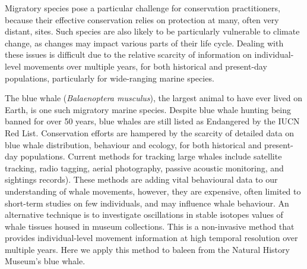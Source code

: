 \documentclass[a4paper,12pt]{article}
\begin{document}
Migratory species pose a particular challenge for conservation practitioners, because their effective conservation relies on protection at many, often very distant, sites\cite{runge2014conserving}. 
Such species are also likely to be particularly vulnerable to climate change, as changes may impact various parts of their life cycle\cite{robinson2009travelling}. 
Dealing with these issues is difficult due to the relative scarcity of information on individual-level movements over multiple years, for both historical and present-day populations, particularly for wide-ranging marine species\cite{ryan2013stable,hall2005stable,bailey2009behavioural}. 
 
The blue whale (\textit{Balaenoptera musculus}), the largest animal to have ever lived on Earth, is one such migratory marine species. 
Despite blue whale hunting being banned for over 50 years, blue whales are still listed as Endangered by the IUCN Red List\cite{reilly2008balaenoptera}.
Conservation efforts are hampered by the scarcity of detailed data on blue whale distribution, behaviour and ecology, for both historical and present-day populations. 
Current methods for tracking large whales include satellite tracking, radio tagging, aerial photography, passive acoustic monitoring, and sightings records\cite{borger15,mcdonald2006biogeographic,bailey2009behavioural,mate2007evolution}). 
These methods are adding vital behavioural data to our understanding of whale movements, however, they are expensive, often limited to short-term studies on few individuals\cite{bailey2009behavioural,best2015tag,mate2007evolution}, and may influence whale behaviour\cite{walker2012review}. 
An alternative technique is to investigate oscillations in stable isotopes values of whale tissues housed in museum collections\cite{ryan2013stable}.
This is a non-invasive method that provides individual-level movement information at high temporal resolution over multiple years. 
Here we apply this method to baleen from the Natural History Museum's blue whale.
 
\end{document}

